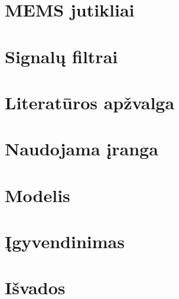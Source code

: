 \documentclass[]{vgtuef}
\begin{document}
  

  \section{MEMS jutikliai}

  

  \section{Signalų filtrai}

  

  \section{Literatūros apžvalga}

  

  \section{Naudojama įranga}

  

  \section{Modelis}

  

  \section{Įgyvendinimas}

  

  \section{Išvados}

  

  \newpage

  
  
\end{document}

